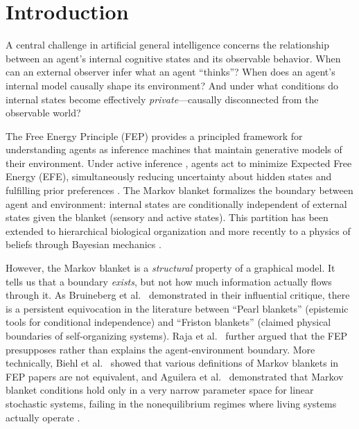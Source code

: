 \documentclass[runningheads]{llncs}
\begin{document}

\section{Introduction}
\label{sec:intro}

A central challenge in artificial general intelligence concerns the relationship between an agent's internal cognitive states and its observable behavior. When can an external observer infer what an agent ``thinks''? When does an agent's internal model causally shape its environment? And under what conditions do internal states become effectively \emph{private}---causally disconnected from the observable world?

The Free Energy Principle (FEP) \cite{friston2006free,friston2010free} provides a principled framework for understanding agents as inference machines that maintain generative models of their environment. Under active inference \cite{parr2022active}, agents act to minimize Expected Free Energy (EFE), simultaneously reducing uncertainty about hidden states and fulfilling prior preferences \cite{parr2019generalized}. The Markov blanket \cite{pearl1988probabilistic,friston2013life} formalizes the boundary between agent and environment: internal states are conditionally independent of external states given the blanket (sensory and active states). This partition has been extended to hierarchical biological organization \cite{kirchhoff2018markov} and more recently to a physics of beliefs through Bayesian mechanics \cite{ramstead2023bayesian}.

However, the Markov blanket is a \emph{structural} property of a graphical model. It tells us that a boundary \emph{exists}, but not how much information actually flows through it. As Bruineberg et al.~\cite{bruineberg2022emperor} demonstrated in their influential critique, there is a persistent equivocation in the literature between ``Pearl blankets'' (epistemic tools for conditional independence) and ``Friston blankets'' (claimed physical boundaries of self-organizing systems). Raja et al.~\cite{raja2021free} further argued that the FEP presupposes rather than explains the agent-environment boundary. More technically, Biehl et al.~\cite{biehl2021technical} showed that various definitions of Markov blankets in FEP papers are not equivalent, and Aguilera et al.~\cite{aguilera2022particular} demonstrated that Markov blanket conditions hold only in a very narrow parameter space for linear stochastic systems, failing in the nonequilibrium regimes where living systems actually operate \cite{aguilera2023knitting}.
\end{document}
